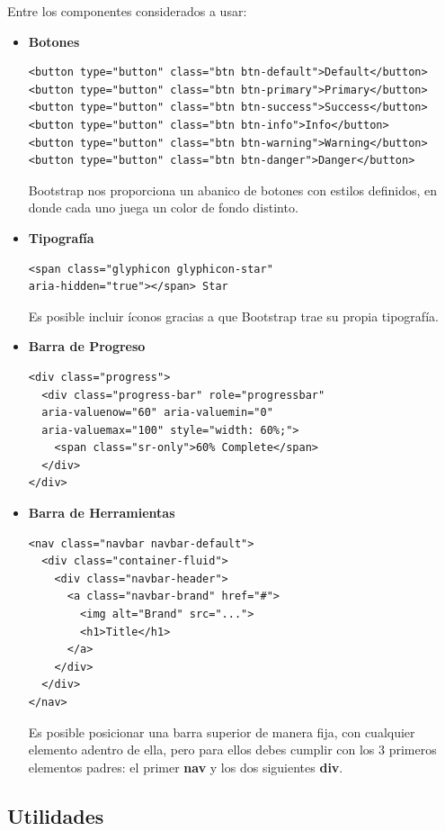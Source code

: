 Entre los componentes considerados a usar:
\begin{itemize}
\item\textbf{Botones}
\begin{verbatim}
<button type="button" class="btn btn-default">Default</button>
<button type="button" class="btn btn-primary">Primary</button>
<button type="button" class="btn btn-success">Success</button>
<button type="button" class="btn btn-info">Info</button>
<button type="button" class="btn btn-warning">Warning</button>
<button type="button" class="btn btn-danger">Danger</button>
\end{verbatim}
Bootstrap nos proporciona un abanico de botones con estilos definidos, en donde cada uno juega un color de fondo distinto.

\item\textbf{Tipografía}
\begin{verbatim}
<span class="glyphicon glyphicon-star"
aria-hidden="true"></span> Star
\end{verbatim}
Es posible incluir íconos gracias a que Bootstrap trae su propia tipografía.

\item\textbf{Barra de Progreso}
\begin{verbatim}
<div class="progress">
  <div class="progress-bar" role="progressbar"
  aria-valuenow="60" aria-valuemin="0"
  aria-valuemax="100" style="width: 60%;">
    <span class="sr-only">60% Complete</span>
  </div>
</div>
\end{verbatim}

\item\textbf{Barra de Herramientas}
\begin{verbatim}
<nav class="navbar navbar-default">
  <div class="container-fluid">
    <div class="navbar-header">
      <a class="navbar-brand" href="#">
        <img alt="Brand" src="...">
        <h1>Title</h1>
      </a>
    </div>
  </div>
</nav>
\end{verbatim}
Es posible posicionar una barra superior de manera fija, con cualquier elemento adentro de ella, pero para ellos debes cumplir con los 3 primeros elementos padres: el primer \textbf{nav} y los dos siguientes \textbf{div}.

\end{itemize}


\subsection{Utilidades}

